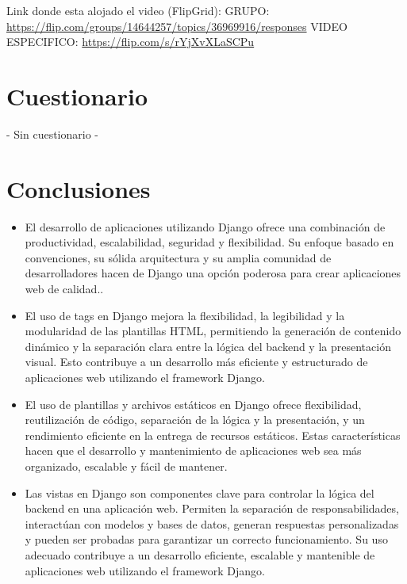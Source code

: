 \documentclass{article}
\begin{document}
        Link donde esta alojado el video (FlipGrid):\newline
        GRUPO:
        \url{https://flip.com/groups/14644257/topics/36969916/responses}\newline
        VIDEO ESPECIFICO:
        \url{https://flip.com/s/rYjXvXLaSCPu}
        
\section{Cuestionario}
	- Sin cuestionario -	
 \newpage
 \section{Conclusiones}
	\begin{itemize}
		\item El desarrollo de aplicaciones utilizando Django ofrece una combinación de productividad, escalabilidad, seguridad y flexibilidad. Su enfoque basado en convenciones, su sólida arquitectura y su amplia comunidad de desarrolladores hacen de Django una opción poderosa para crear aplicaciones web de calidad..
            \item El uso de tags en Django mejora la flexibilidad, la legibilidad y la modularidad de las plantillas HTML, permitiendo la generación de contenido dinámico y la separación clara entre la lógica del backend y la presentación visual. Esto contribuye a un desarrollo más eficiente y estructurado de aplicaciones web utilizando el framework Django.
            \item El uso de plantillas y archivos estáticos en Django ofrece flexibilidad, reutilización de código, separación de la lógica y la presentación, y un rendimiento eficiente en la entrega de recursos estáticos. Estas características hacen que el desarrollo y mantenimiento de aplicaciones web sea más organizado, escalable y fácil de mantener.
            \item Las vistas en Django son componentes clave para controlar la lógica del backend en una aplicación web. Permiten la separación de responsabilidades, interactúan con modelos y bases de datos, generan respuestas personalizadas y pueden ser probadas para garantizar un correcto funcionamiento. Su uso adecuado contribuye a un desarrollo eficiente, escalable y mantenible de aplicaciones web utilizando el framework Django.
	\end{itemize}	
\clearpage
\end{document}
